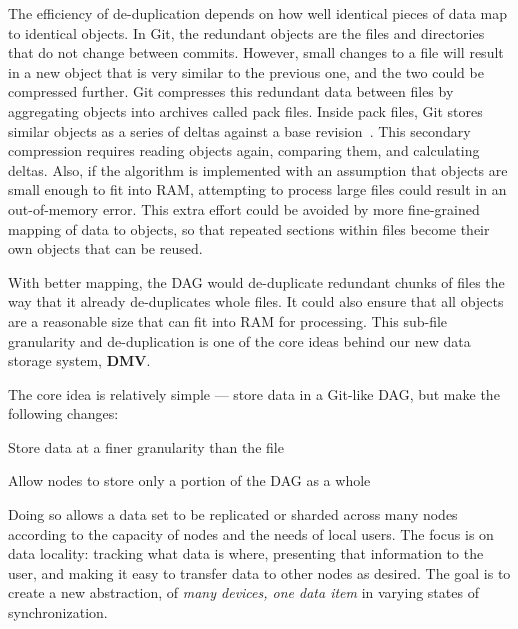 The efficiency of de-duplication depends on how well identical pieces of data map to identical objects.
In Git, the redundant objects are the files and directories that do not change between commits.
However, small changes to a file will result in a new object that is very similar to the previous one, and the two could be compressed further.
Git compresses this redundant data between files by aggregating objects into archives called pack files.
Inside pack files, Git stores similar objects as a series of deltas against a base revision~\cite[Section 10.4]{git_book}.
This secondary compression requires reading objects again, comparing them, and calculating deltas.
Also, if the algorithm is implemented with an assumption that objects are small enough to fit into RAM, attempting to process large files could result in an out-of-memory error.
This extra effort could be avoided by more fine-grained mapping of data to objects, so that repeated sections within files become their own objects that can be reused.

With better mapping, the DAG would de-duplicate redundant chunks of files the way that it already de-duplicates whole files.
It could also ensure that all objects are a reasonable size that can fit into RAM for processing.
This sub-file granularity and de-duplication is one of the core ideas behind our new data storage system, \textbf{\acrfull{DMV}}.


%

The core idea is relatively simple --- store data in a Git-like \gls{DAG}, but make the following changes:

\begin{tight_enumerate}

    \item{Store data at a finer granularity than the file}

    \item{Allow nodes to store only a portion of the \gls{DAG} as a whole}

\end{tight_enumerate}

Doing so allows a data set to be replicated or sharded across many nodes according to the capacity of nodes and the needs of local users.
The focus is on data locality: tracking what data is where, presenting that information to the user, and making it easy to transfer data to other nodes as desired.
The goal is to create a new abstraction, of \emph{many devices, one data item} in varying states of synchronization.

